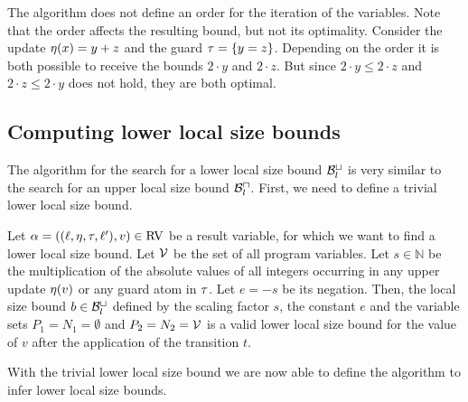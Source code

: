The algorithm does not define an order for the iteration of the variables.
Note that the order affects the resulting bound, but not its optimality.
Consider the update $\eta(x) = y + z$ and the guard $\tau = \lbrace y = z \rbrace$.
Depending on the order it is both possible to receive the bounds $2 \cdot y$ and $2 \cdot z$.
But since $2 \cdot y \leq 2 \cdot z$ and $2 \cdot z \leq 2 \cdot y$ does not hold, they are both optimal.

\subsection{Computing lower local size bounds}

The algorithm for the search for a lower local size bound $\mathcal{B}^\sqcup_l$ is very similar to the search for an upper local size bound $\mathcal{B}^\sqcap_l$.
First, we need to define a trivial lower local size bound.

\begin{definition}
  Let $\alpha = ((\ell,\eta,\tau,\ell'),v) \in \text{RV}$ be a result variable, for which we want to find a lower local size bound.
  Let $\mathcal{V}$ be the set of all program variables.
  Let $s \in \mathbb{N}$ be the multiplication of the absolute values of all integers occurring in any upper update $\eta(v)$ or any guard atom in $\tau$.
  Let $e = -s$ be its negation.
  Then, the local size bound $b \in \mathcal{B}^\sqcup_l$ defined by the scaling factor $s$, the constant $e$ and the variable sets $P_1 = N_1 = \emptyset$ and $P_2 = N_2 = \mathcal{V}$ is a valid lower local size bound for the value of $v$ after the application of the transition $t$.
\end{definition}

With the trivial lower local size bound we are now able to define the algorithm to infer lower local size bounds.

